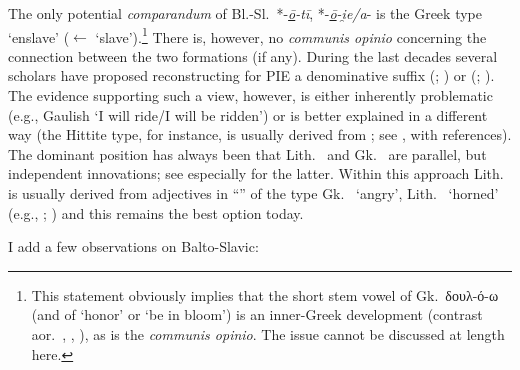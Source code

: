 \documentclass[output=paper,colorlinks,citecolor=brown]{langscibook}
\begin{document}
The only potential \textit{comparandum} of Bl.-Sl.\ *-\textit{\underline{ō}-tī}, *-\textit{\underline{ō}-i̯e/a}- is the Greek type  ‘enslave’ ($\leftarrow$  ‘slave’).\footnote{This statement obviously implies that the short stem vowel of Gk.\ δουλ-ό-ω (and of  ‘honor’ or  ‘be in bloom’) is an inner-Greek development (contrast aor.\ , , ), as is the \textit{communis opinio}. The issue cannot be discussed at length here.} There is, however, no \textit{communis opinio} concerning the connection between the two formations (if any). During the last decades several scholars have proposed reconstructing for PIE a denominative suffix  (\citealt{Peters1999}; \citealt[401--402]{Malzahn2010}) or  (\citealt[357--358]{Oettinger1979}; \citealt[132--133]{Kloekhorst2008}). The evidence supporting such a view, however, is either inherently problematic (e.g., Gaulish  ‘I will ride/I will be ridden’) or is better explained in a different way (the Hittite type, for instance, is usually derived from ; see \citealt[116--123]{Sasseville2021}, with references). The dominant position has always been that Lith.\  and Gk.\  are parallel, but independent innovations; see especially \citet[15--22]{Tucker1981} for the latter. Within this approach Lith.\  is usually derived from  adjectives in “” of the type Gk.\  ‘angry’, Lith.\  ‘horned’ (e.g., \citealt[627--628]{Endzelin1923}; \citealt[364]{Stang1966}) and this remains the best option today.

I add a few observations on Balto-Slavic:
\end{document}
